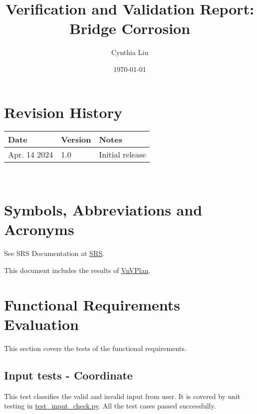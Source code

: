 \documentclass[12pt, titlepage]{article}
\begin{document}
\title{Verification and Validation Report: Bridge Corrosion} 
\author{Cynthia Liu}
\date{\today}
	
\maketitle


\section{Revision History}

\begin{tabularx}{\textwidth}{p{3cm}p{2cm}X}
\toprule {\bf Date} & {\bf Version} & {\bf Notes}\\
\midrule
Apr. 14 2024 & 1.0 & Initial release\\
\bottomrule
\end{tabularx}

~\newpage

\section{Symbols, Abbreviations and Acronyms}
See SRS Documentation at \href{https://github.com/CynthiaLiu0805/BridgeCorrosion/blob/main/docs/SRS/SRS.pdf}{SRS}.



\newpage

\tableofcontents

\listoftables %

\listoffigures %

\newpage


This document includes the results of \href{https://github.com/CynthiaLiu0805/BridgeCorrosion/blob/main/docs/VnVPlan/VnVPlan.pdf}{VnVPlan}. 

\section{Functional Requirements Evaluation}\label{FRE}
This section covers the tests of the functional requirements.
\subsection{Input tests - Coordinate}
This test classifies the valid and invalid input from user. It is covered by unit testing in \href{https://github.com/CynthiaLiu0805/BridgeCorrosion/blob/main/src/app/test_input_check.py}{test\_input\_check.py}. All the test cases passed successfully. 
\end{document}

